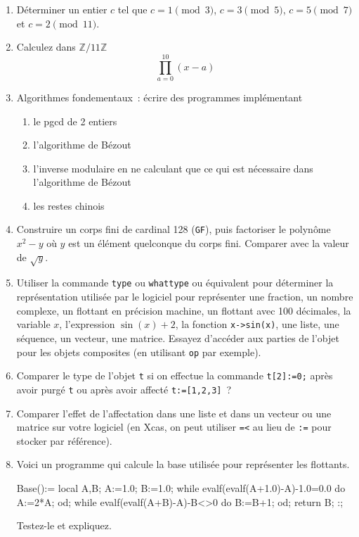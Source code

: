 \documentclass[a4paper,11pt]{article}
\newcommand{\Z}{{\mathbb{Z}}}
\begin{document}
\begin{giacjshere}
\begin{enumerate}
\item D\'eterminer un entier $c$ tel que $c=1 \pmod 3$, 
$c=3 \pmod 5$, $c=5 \pmod 7$ et $c=2 \pmod{11}$.
\item Calculez dans $\Z/11\Z$
\[  \prod_{a=0}^{10} (x-a)\]
\item Algorithmes fondementaux~: \'ecrire des programmes impl\'ementant
\begin{enumerate}
\item le pgcd de 2 entiers
\item l'algorithme de B\'ezout
\item l'inverse modulaire en ne calculant que ce qui est n\'ecessaire
dans l'algorithme de B\'ezout
\item les restes chinois
\end{enumerate}

\item Construire un corps fini de cardinal 128 (\verb|GF|), puis factoriser
le polyn\^ome $x^2-y$ o\`u $y$ est un \'el\'ement quelconque du corps
fini.
Comparer avec la valeur de $\sqrt{y}$.
\item Utiliser la commande {\tt type} ou {\tt whattype} ou \'equivalent
pour d\'eterminer la repr\'esentation
utilis\'ee par le logiciel pour repr\'esenter
une fraction, un nombre complexe, un flottant en pr\'ecision machine, 
un flottant avec 100 d\'ecimales, la variable $x$, l'expression $\sin(x)+2$,
la fonction {\tt x->sin(x)}, une liste, une s\'equence, un vecteur,
une matrice. Essayez d'acc\'eder aux parties de
l'objet pour les objets composites (en utilisant {\tt op} par exemple).
\item Comparer le type de l'objet \verb|t| si on effectue
la commande \verb|t[2]:=0;| apr\`es avoir purg\'e \verb|t|
ou apr\`es avoir affect\'e \verb|t:=[1,2,3]|~?
\item Comparer l'effet de l'affectation dans une liste et dans un
  vecteur ou une matrice sur votre logiciel (en Xcas, on peut utiliser
\verb|=<| au lieu de \verb|:=| pour stocker par r\'ef\'erence).
\item Voici un programme qui calcule la base utilis\'ee
pour repr\'esenter les flottants. 
\begin{giacprog}
Base():={
  local A,B;
  A:=1.0; B:=1.0;
  while evalf(evalf(A+1.0)-A)-1.0=0.0 do  A:=2*A; od;
  while evalf(evalf(A+B)-A)-B<>0 do B:=B+1; od;
  return B;
} :;
\end{giacprog}
Testez-le  et expliquez.


\end{enumerate}
\end{giacjshere}
\end{document}
